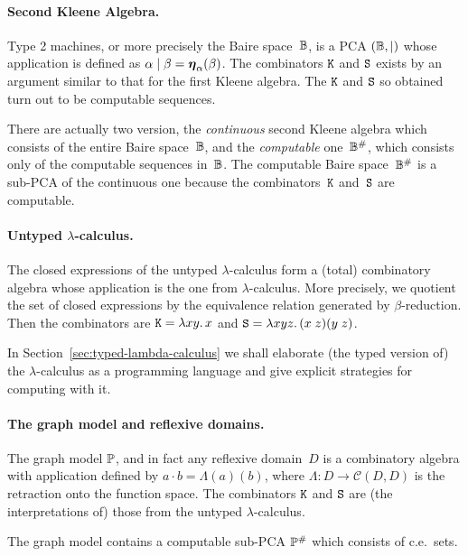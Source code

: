 \paragraph{Second Kleene Algebra.}

Type 2 machines, or more precisely the Baire space~$\mathbb{B}$, is a PCA
$(\mathbb{B}, {\mid})$ whose application is defined as $\alpha \mid \beta
= \text{\boldmath{$\eta$}}_{\alpha}(\beta)$. The combinators $\mathtt{K}$ and $\mathtt{S}$ exists
by an argument similar to that for the first Kleene algebra. The
$\mathtt{K}$ and $\mathtt{S}$ so obtained turn out to be computable sequences.

There are actually two version, the \emph{continuous} second Kleene
algebra which consists of the entire Baire space~$\mathbb{B}$, and the
\emph{computable} one~$\mathbb{B}^{\#}$, which consists only of the
computable sequences in~$\mathbb{B}$. The computable Baire
space~$\mathbb{B}^{\#}$ is a sub-PCA of the continuous one because the
combinators~$\mathtt{K}$ and~$\mathtt{S}$ are computable.

\paragraph{Untyped $\lambda$-calculus.}

The closed expressions of the untyped $\lambda$-calculus form a
(total) combinatory algebra whose application is the one from
$\lambda$-calculus. More precisely, we quotient the set of closed
expressions by the equivalence relation generated by
$\beta$-reduction. Then the combinators are $\mathtt{K} = \lambda x y .\,x$
and $\mathtt{S} = \lambda x y z .\,(x \; z)(y \; z)$.

In Section~\ref{sec:typed-lambda-calculus} we shall elaborate
(the typed version of) the $\lambda$-calculus as a programming
language and give explicit strategies for computing with it.


\paragraph{The graph model and reflexive domains.}

The graph model $\mathbb{P}$, and in fact any reflexive domain~$D$ is a
combinatory algebra with application defined by $a \cdot b =
\Lambda(a)(b)$, where $\Lambda : D \to \mathcal{C}(D, D)$ is the
retraction onto the function space. The combinators $\mathtt{K}$ and
$\mathtt{S}$ are (the interpretations of) those from the untyped
$\lambda$-calculus.

The graph model contains a computable sub-PCA $\mathbb{P}^{\#}$ which
consists of c.e.~sets.



